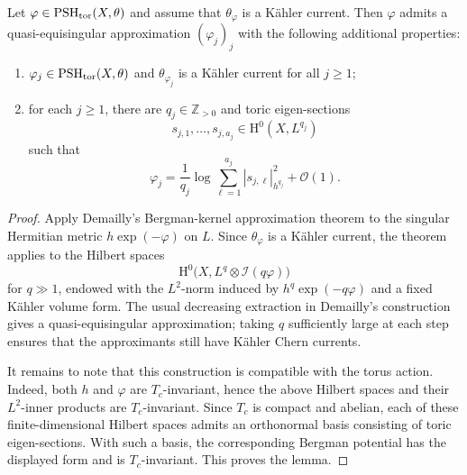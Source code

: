 \begin{lemma}\label{lma:toricBergmanapprox}
    Let $\varphi\in \mathrm{PSH}_{\mathrm{tor}}(X,\theta)$ and assume that $\theta_{\varphi}$ is a Kähler current. Then $\varphi$ admits a quasi-equisingular approximation $(\varphi_j)_j$ with the following additional properties:
    \begin{enumerate}
        \item\label{itm:lma:toricBergmanapprox:1} $\varphi_j\in \mathrm{PSH}_{\mathrm{tor}}(X,\theta)$ and $\theta_{\varphi_j}$ is a Kähler current for all $j\geq 1$;
        \item\label{itm:lma:toricBergmanapprox:2} for each $j\geq 1$, there are $q_j\in\mathbb Z_{>0}$ and toric eigen-sections
        \[
            s_{j,1},\ldots,s_{j,a_j}\in \mathrm{H}^0(X,L^{q_j})
        \]
        such that
        \[
            \varphi_j=\frac{1}{q_j}\log\sum_{\ell=1}^{a_j}|s_{j,\ell}|_{h^{q_j}}^2+\mathcal O(1).
        \]
    \end{enumerate}
\end{lemma}
\begin{proof}
    Apply Demailly's Bergman-kernel approximation theorem \cite[Theorem~13.21]{Dem12} to the singular Hermitian metric $h\exp(-\varphi)$ on $L$. Since $\theta_{\varphi}$ is a Kähler current, the theorem applies to the Hilbert spaces
    \[
        \mathrm{H}^0\bigl(X,L^q\otimes\mathcal I(q\varphi)\bigr)
    \]
    for $q\gg 1$, endowed with the $L^2$-norm induced by $h^q\exp(-q\varphi)$ and a fixed Kähler volume form. The usual decreasing extraction in Demailly's construction gives a quasi-equisingular approximation; taking $q$ sufficiently large at each step ensures that the approximants still have Kähler Chern currents.

    It remains to note that this construction is compatible with the torus action. Indeed, both $h$ and $\varphi$ are $T_c$-invariant, hence the above Hilbert spaces and their $L^2$-inner products are $T_c$-invariant. Since $T_c$ is compact and abelian, each of these finite-dimensional Hilbert spaces admits an orthonormal basis consisting of toric eigen-sections. With such a basis, the corresponding Bergman potential has the displayed form and is $T_c$-invariant. This proves the lemma.
\end{proof}


